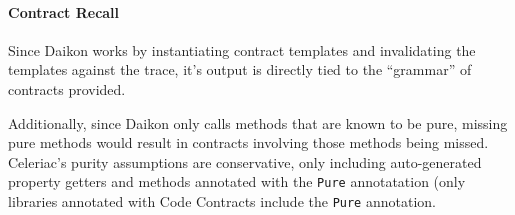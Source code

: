 \paragraph{Contract Recall}

Since Daikon works by instantiating contract templates and
invalidating the templates against the trace, it's output is directly
tied to the ``grammar'' of contracts provided.

Additionally, since Daikon only calls methods that are known to be
pure, missing pure methods would result in contracts involving those
methods being missed. Celeriac's purity assumptions are conservative,
only including auto-generated property getters and methods annotated
with the \verb|Pure| annotatation (only libraries annotated with Code
Contracts include the \verb|Pure| annotation.
